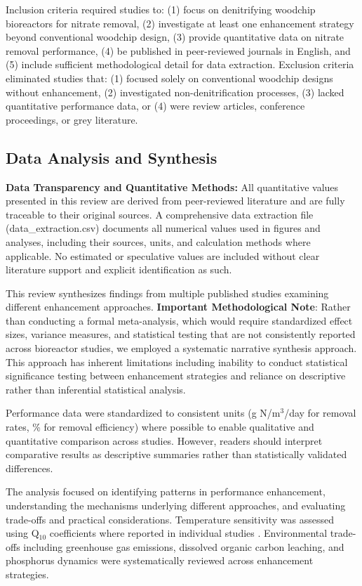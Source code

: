 \documentclass[12pt,a4paper]{article}
\begin{document}
Inclusion criteria required studies to: (1) focus on denitrifying woodchip bioreactors for nitrate removal, (2) investigate at least one enhancement strategy beyond conventional woodchip design, (3) provide quantitative data on nitrate removal performance, (4) be published in peer-reviewed journals in English, and (5) include sufficient methodological detail for data extraction. Exclusion criteria eliminated studies that: (1) focused solely on conventional woodchip designs without enhancement, (2) investigated non-denitrification processes, (3) lacked quantitative performance data, or (4) were review articles, conference proceedings, or grey literature.

\subsection{Data Analysis and Synthesis}

\textbf{Data Transparency and Quantitative Methods:} All quantitative values presented in this review are derived from peer-reviewed literature and are fully traceable to their original sources. A comprehensive data extraction file (data\_extraction.csv) documents all numerical values used in figures and analyses, including their sources, units, and calculation methods where applicable. No estimated or speculative values are included without clear literature support and explicit identification as such.

This review synthesizes findings from multiple published studies examining different enhancement approaches. \textbf{Important Methodological Note}: Rather than conducting a formal meta-analysis, which would require standardized effect sizes, variance measures, and statistical testing that are not consistently reported across bioreactor studies, we employed a systematic narrative synthesis approach. This approach has inherent limitations including inability to conduct statistical significance testing between enhancement strategies and reliance on descriptive rather than inferential statistical analysis.

Performance data were standardized to consistent units (g N/m$^3$/day for removal rates, \% for removal efficiency) where possible to enable qualitative and quantitative comparison across studies. However, readers should interpret comparative results as descriptive summaries rather than statistically validated differences.

The analysis focused on identifying patterns in performance enhancement, understanding the mechanisms underlying different approaches, and evaluating trade-offs and practical considerations. Temperature sensitivity was assessed using Q$_{10}$ coefficients where reported in individual studies \citep{RN242, RN258}. Environmental trade-offs including greenhouse gas emissions, dissolved organic carbon leaching, and phosphorus dynamics were systematically reviewed across enhancement strategies.
\end{document}
